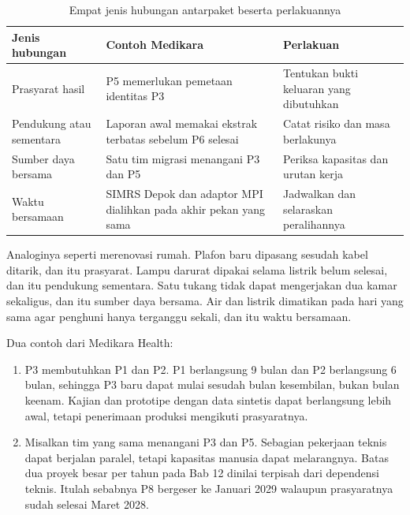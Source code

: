 \begin{table}[!htb]
  \centering
  \caption{Empat jenis hubungan antarpaket beserta perlakuannya}
  \label{tab:ch11-jenis-dependensi}
  \small
  \begin{tabularx}{\textwidth}{>{\raggedright\arraybackslash}p{2.7cm}>{\raggedright\arraybackslash}X>{\raggedright\arraybackslash}X}
    \hline
    \textbf{Jenis hubungan} & \textbf{Contoh Medikara} & \textbf{Perlakuan} \\ \hline
    Prasyarat hasil & P5 memerlukan pemetaan identitas P3 & Tentukan bukti keluaran yang dibutuhkan \\ \hline
    Pendukung atau sementara & Laporan awal memakai ekstrak terbatas sebelum P6 selesai & Catat risiko dan masa berlakunya \\ \hline
    Sumber daya bersama & Satu tim migrasi menangani P3 dan P5 & Periksa kapasitas dan urutan kerja \\ \hline
    Waktu bersamaan & SIMRS Depok dan adaptor MPI dialihkan pada akhir pekan yang sama & Jadwalkan dan selaraskan peralihannya \\ \hline
  \end{tabularx}
\end{table}

Analoginya seperti merenovasi rumah. Plafon baru dipasang sesudah kabel ditarik, dan itu prasyarat.
Lampu darurat dipakai selama listrik belum selesai, dan itu pendukung sementara. Satu tukang tidak
dapat mengerjakan dua kamar sekaligus, dan itu sumber daya bersama. Air dan listrik dimatikan pada
hari yang sama agar penghuni hanya terganggu sekali, dan itu waktu bersamaan.

Dua contoh dari Medikara Health:
\begin{enumerate}
  \item P3 membutuhkan P1 dan P2. P1 berlangsung 9 bulan dan P2 berlangsung 6 bulan, sehingga P3 baru
        dapat mulai sesudah bulan kesembilan, bukan bulan keenam. Kajian dan prototipe dengan data sintetis
        dapat berlangsung lebih awal, tetapi penerimaan produksi mengikuti prasyaratnya.
  \item Misalkan tim yang sama menangani P3 dan P5. Sebagian pekerjaan teknis dapat berjalan paralel,
        tetapi kapasitas manusia dapat melarangnya. Batas dua proyek besar per tahun pada Bab 12 dinilai
        terpisah dari dependensi teknis. Itulah sebabnya P8 bergeser ke Januari 2029 walaupun prasyaratnya
        sudah selesai Maret 2028.
\end{enumerate}

